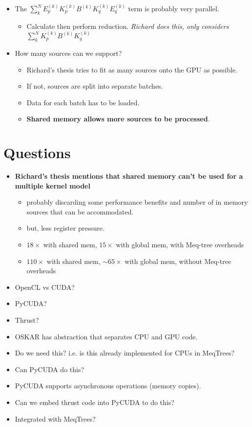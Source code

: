 \documentclass[]{article}
\begin{document}
\begin{itemize}
\item The $\sum_k^N E_p^{(k)} K_p^{(k)} B^{(k)} K_q^{(k)} E_q^{(k)}$ term is probably very parallel.
\begin{itemize}
\item Calculate then perform reduction. {\it Richard does this, only considers $\sum_k^N K_p^{(k)} B^{(k)} K_q^{(k)}$}
\end{itemize}
\item How many sources can we support?
\begin{itemize}
\item Richard's thesis tries to fit as many sources onto the GPU as possible.
\item If not, sources are split into separate batches.
\item Data for each batch has to be loaded.
\item {\bf Shared memory allows more sources to be processed}.
\end{itemize}
\end{itemize}

\section{Questions}

\begin{itemize}
\item {\bf Richard's thesis mentions that shared memory can't be used for a multiple kernel model}
\begin{itemize}
\item probably discarding some performance benefits and number of in memory sources that can be accommodated.
\item but, less register pressure.
\item $18 \times$ with shared mem, $15 \times$ with global mem, with Meq-tree overheads
\item $110 \times$ with shared mem, $\sim 65 \times$ with global mem, without Meq-tree overheads
\end{itemize}
\item OpenCL vs CUDA?
\item PyCUDA?
\item Thrust?
\item OSKAR has abstraction that separates CPU and GPU code.
\item Do we need this? i.e. is this already implemented for CPUs in MeqTrees?
\item Can PyCUDA do this?
\item PyCUDA supports asynchronous operations (memory copies).
\item Can we embed thrust code into PyCUDA to do this?
\item Integrated with MeqTrees?
\end{itemize}



\end{document}
